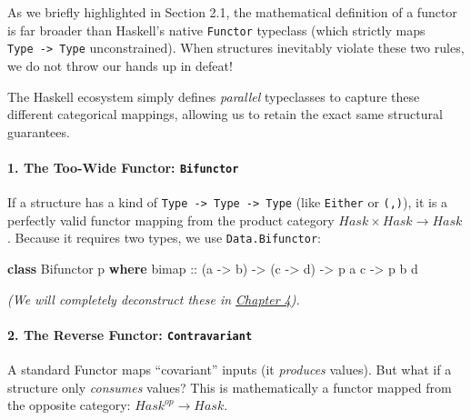 \documentclass[
]{article}
\newenvironment{Shaded}{}{}
\newcommand{\DataTypeTok}[1]{\textcolor[rgb]{0.56,0.13,0.00}{#1}}
\newcommand{\KeywordTok}[1]{\textcolor[rgb]{0.00,0.44,0.13}{\textbf{#1}}}
\newcommand{\NormalTok}[1]{#1}
\newcommand{\OtherTok}[1]{\textcolor[rgb]{0.00,0.44,0.13}{#1}}
\begin{document}
As we briefly highlighted in Section 2.1, the mathematical definition of
a functor is far broader than Haskell's native \texttt{Functor}
typeclass (which strictly maps \texttt{Type\ -\textgreater{}\ Type}
unconstrained). When structures inevitably violate these two rules, we
do not throw our hands up in defeat!

The Haskell ecosystem simply defines \emph{parallel} typeclasses to
capture these different categorical mappings, allowing us to retain the
exact same structural guarantees.

\paragraph{\texorpdfstring{1. The Too-Wide Functor:
\texttt{Bifunctor}}{1. The Too-Wide Functor: Bifunctor}}\label{the-too-wide-functor-bifunctor}

If a structure has a kind of
\texttt{Type\ -\textgreater{}\ Type\ -\textgreater{}\ Type} (like
\texttt{Either} or \texttt{(,)}), it is a perfectly valid functor
mapping from the product category \(Hask \times Hask \to Hask\). Because
it requires two types, we use \texttt{Data.Bifunctor}:

\begin{Shaded}
\begin{Highlighting}[]
\KeywordTok{class} \DataTypeTok{Bifunctor}\NormalTok{ p }\KeywordTok{where}
\OtherTok{    bimap ::}\NormalTok{ (a }\OtherTok{{-}\textgreater{}}\NormalTok{ b) }\OtherTok{{-}\textgreater{}}\NormalTok{ (c }\OtherTok{{-}\textgreater{}}\NormalTok{ d) }\OtherTok{{-}\textgreater{}}\NormalTok{ p a c }\OtherTok{{-}\textgreater{}}\NormalTok{ p b d}
\end{Highlighting}
\end{Shaded}

\emph{(We will completely deconstruct these in
\hyperref[chapter-4-deep-dive-into-bifunctors]{Chapter 4}).}

\paragraph{\texorpdfstring{2. The Reverse Functor:
\texttt{Contravariant}}{2. The Reverse Functor: Contravariant}}\label{the-reverse-functor-contravariant}

A standard Functor maps ``covariant'' inputs (it \emph{produces}
values). But what if a structure only \emph{consumes} values? This is
mathematically a functor mapped from the opposite category:
\(Hask^{op} \to Hask\).
\end{document}
